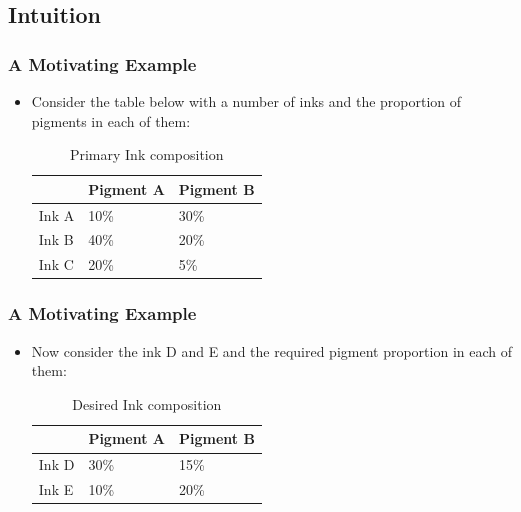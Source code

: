 \documentclass{beamer}
\begin{document}
\subsection{Intuition}
\begin{frame}
  \frametitle{A Motivating Example}
  \begin{itemize}
  \item Consider the table below with a number of inks and the proportion of pigments in each of them:
    \begin{table}[]
    \caption{Primary Ink composition}
    \begin{tabular}{|l|l|l|}
    \hline
          & Pigment A & Pigment B \\ \hline
    Ink A & 10\%      & 30\%      \\ \hline
    Ink B & 40\%      & 20\%      \\ \hline
    Ink C & 20\%      & 5\%       \\ \hline
    \end{tabular}
    \end{table}
  \end{itemize}
\end{frame}


\begin{frame}
  \frametitle{A Motivating Example}
  \begin{itemize}
        \item Now consider the ink D and E and the required pigment proportion in each of them:
        \begin{table}[]
        \caption{Desired Ink composition}
        \begin{tabular}{|l|l|l|}
        \hline
              & Pigment A & Pigment B \\ \hline
        Ink D & 30\%      & 15\%      \\ \hline
        Ink E & 10\%      & 20\%      \\ \hline
        \end{tabular}
        \end{table}
  \end{itemize}
\end{frame}
\end{document}
